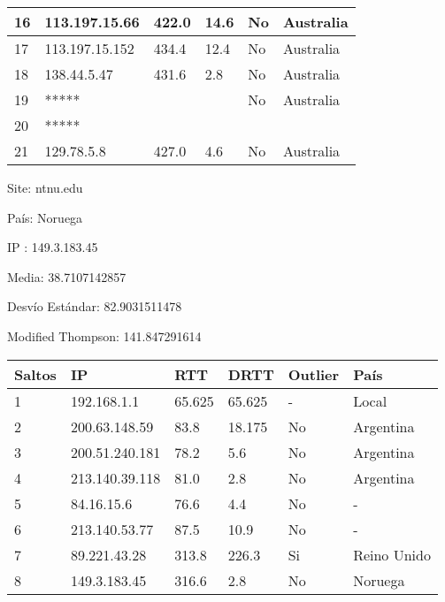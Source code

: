 \begin{center}
\begin{tabular}{| l | l | l | l | l | l | }
    16   &    113.197.15.66   & 422.0 &  14.6  & No & Australia      \\ \hline
    17   &    113.197.15.152  & 434.4 &  12.4  & No & Australia      \\ \hline
    18   &    138.44.5.47     & 431.6 &  2.8   & No & Australia      \\ \hline
    19   &    *****           &       &        & No & Australia      \\ \hline
    20   &    *****           &       &        &    &                \\ \hline
    21   &    129.78.5.8      & 427.0 & 4.6    & No & Australia      \\ \hline
    \end{tabular}
\end{center}

Site: ntnu.edu

País: Noruega

IP : 149.3.183.45

Media: 38.7107142857 

Desvío Estándar: 82.9031511478 

Modified Thompson: 141.847291614

\begin{center}
    \begin{tabular}{| l | l | l | l | l | l | }
    \hline
    Saltos & IP             & RTT    & DRTT   & Outlier & País        \\ \hline
    1      & 192.168.1.1    & 65.625 & 65.625 & -       & Local       \\ \hline
    2      & 200.63.148.59  & 83.8   & 18.175 & No      & Argentina   \\ \hline
    3      & 200.51.240.181 & 78.2   & 5.6    & No      & Argentina   \\ \hline
    4      & 213.140.39.118 & 81.0   & 2.8    & No      & Argentina   \\ \hline
    5      & 84.16.15.6     & 76.6   & 4.4    & No      & -           \\ \hline
    6      & 213.140.53.77  & 87.5   & 10.9   & No      & -           \\ \hline
    7      & 89.221.43.28   & 313.8  & 226.3  & Si      & Reino Unido \\ \hline
    8      & 149.3.183.45   & 316.6  & 2.8    & No      & Noruega     \\ \hline
    \end{tabular}
\end{center}

